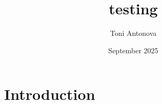 \documentclass{article}
\title{testing}
\author{Toni Antonova}
\date{September 2025}
\begin{document}
\maketitle

\section{Introduction}
\end{document}
